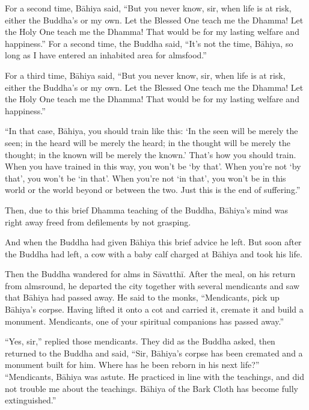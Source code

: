 \documentclass[12pt,openany]{book}%
\begin{document}
For a second time, \textsanskrit{Bāhiya} said, “But you never know, sir, when life is at risk, either the Buddha’s or my own. Let the Blessed One teach me the Dhamma! Let the Holy One teach me the Dhamma! That would be for my lasting welfare and happiness.” For a second time, the Buddha said, “It’s not the time, \textsanskrit{Bāhiya}, so long as I have entered an inhabited area for almsfood.” 

For a third time, \textsanskrit{Bāhiya} said, “But you never know, sir, when life is at risk, either the Buddha’s or my own. Let the Blessed One teach me the Dhamma! Let the Holy One teach me the Dhamma! That would be for my lasting welfare and happiness.” 

“In that case, \textsanskrit{Bāhiya}, you should train like this: ‘In the seen will be merely the seen; in the heard will be merely the heard; in the thought will be merely the thought; in the known will be merely the known.’ That’s how you should train. When you have trained in this way, you won’t be ‘by that’. When you’re not ‘by that’, you won’t be ‘in that’. When you’re not ‘in that’, you won’t be in this world or the world beyond or between the two. Just this is the end of suffering.” 

Then, due to this brief Dhamma teaching of the Buddha, \textsanskrit{Bāhiya}’s mind was right away freed from defilements by not grasping. 

And when the Buddha had given \textsanskrit{Bāhiya} this brief advice he left. But soon after the Buddha had left, a cow with a baby calf charged at \textsanskrit{Bāhiya} and took his life. 

Then the Buddha wandered for alms in \textsanskrit{Sāvatthī}. After the meal, on his return from almsround, he departed the city together with several mendicants and saw that \textsanskrit{Bāhiya} had passed away. He said to the monks, “Mendicants, pick up \textsanskrit{Bāhiya}’s corpse. Having lifted it onto a cot and carried it, cremate it and build a monument. Mendicants, one of your spiritual companions has passed away.” 

“Yes, sir,” replied those mendicants. They did as the Buddha asked, then returned to the Buddha and said, “Sir, \textsanskrit{Bāhiya}’s corpse has been cremated and a monument built for him. Where has he been reborn in his next life?” “Mendicants, \textsanskrit{Bāhiya} was astute. He practiced in line with the teachings, and did not trouble me about the teachings. \textsanskrit{Bāhiya} of the Bark Cloth has become fully extinguished.” 
\end{document}
